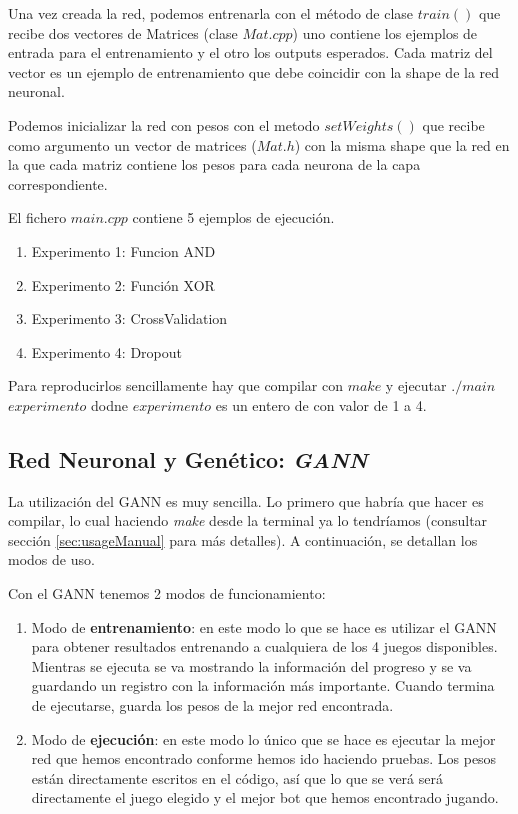 Una vez creada la red, podemos entrenarla con el método de clase $train()$ que recibe dos vectores de Matrices (clase $Mat.cpp$) uno contiene los ejemplos de entrada para el entrenamiento y el otro los outputs esperados. Cada matriz del vector es un ejemplo de entrenamiento que debe coincidir con la shape de la red neuronal.

Podemos inicializar la red con pesos con el metodo $setWeights()$ que recibe como argumento un vector de matrices ($Mat.h$) con la misma shape que la red en la que cada matriz contiene los pesos para cada neurona de la capa correspondiente.  

El fichero $main.cpp$ contiene 5 ejemplos de ejecución.

\begin{enumerate}
    \item Experimento 1: Funcion AND 
    \item Experimento 2: Función XOR
    \item Experimento 3: CrossValidation
    \item Experimento 4: Dropout
\end{enumerate}

Para reproducirlos sencillamente hay que compilar con $make$ y ejecutar $./main$ $experimento$ dodne $experimento$ es un entero de con valor de 1 a 4.

\newpage
\subsection{Red Neuronal y Genético: \textit{GANN}}

La utilización del GANN es muy sencilla. Lo primero que habría que hacer es compilar, lo cual haciendo \textit{make} desde la terminal ya lo tendríamos (consultar sección \ref{sec:usageManual} para más detalles). A continuación, se detallan los modos de uso.

Con el GANN tenemos 2 modos de funcionamiento:

\begin{enumerate}
    \item Modo de \textbf{entrenamiento}: en este modo lo que se hace es utilizar el GANN para obtener resultados entrenando a cualquiera de los 4 juegos disponibles. Mientras se ejecuta se va mostrando la información del progreso y se va guardando un registro con la información más importante. Cuando termina de ejecutarse, guarda los pesos de la mejor red encontrada.
    \item Modo de \textbf{ejecución}: en este modo lo único que se hace es ejecutar la mejor red que hemos encontrado conforme hemos ido haciendo pruebas. Los pesos están directamente escritos en el código, así que lo que se verá será directamente el juego elegido y el mejor bot que hemos encontrado jugando.
\end{enumerate}

